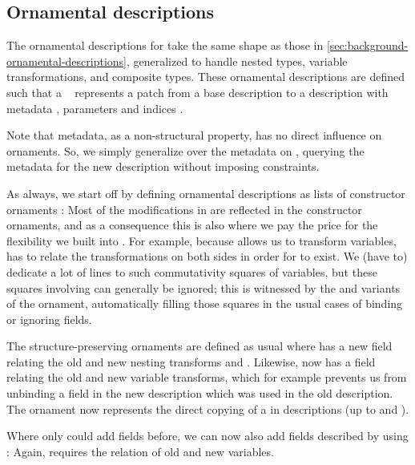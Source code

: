 \subsection{Ornamental descriptions}
The ornamental descriptions for  take the same shape as those in \autoref{sec:background-ornamental-descriptions}, generalized to handle nested types, variable transformations, and composite types. These ornamental descriptions are defined such that a \  represents a patch from a base description  to a description with metadata , parameters  and indices .

Note that metadata, as a non-structural property, has no direct influence on ornaments. So, we simply generalize over the metadata on , querying the metadata for the new description without imposing constraints.

As always, we start off by defining ornamental descriptions as lists of constructor ornaments :
Most of the modifications in  are reflected in the constructor ornaments, and as a consequence this is also where we pay the price for the flexibility we built into . For example, because  allows us to transform variables,  has to relate the transformations on both sides in order for  to exist. We (have to) dedicate a lot of lines to such commutativity squares of variables, but these squares involving  can generally be ignored; this is witnessed by the  and  variants of the  ornament, automatically filling those squares in the usual cases of binding or ignoring fields.

The structure-preserving ornaments are defined as usual
where  has a new field relating the old and new nesting transforms  and . Likewise,  now has a field relating the old and new variable transforms, which for example prevents us from unbinding a field in the new description which was used in the old description. The ornament  now represents the direct copying of a  in descriptions (up to  and ).

Where only  could add fields before, we can now also add fields described by  using :
Again,  requires the relation of old and new variables.

